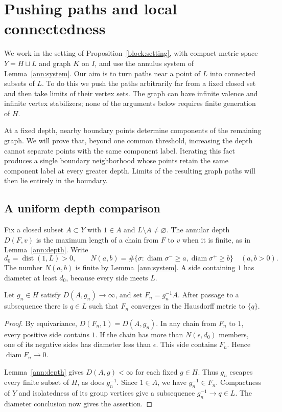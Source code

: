 \section{Pushing paths and local connectedness}\label{sec:path-pushing}

We work in the setting of Proposition~\ref{block:setting}, with compact
metric space $Y=H\sqcup L$ and graph $K$ on $I$, and use the annulus system
of Lemma~\ref{ann:system}.  Our aim is to turn paths near a point of $L$
into connected subsets of $L$.  To do this we push the paths arbitrarily
far from a fixed closed set and then take limits of their vertex sets.
The graph can have infinite valence and infinite vertex stabilizers;
none of the arguments below requires finite generation of $H$.

At a fixed depth, nearby boundary points determine components of the
remaining graph. We will prove that, beyond one common threshold,
increasing the depth cannot separate points with the same component
label. Iterating this fact produces a single boundary neighborhood whose
points retain the same component label at every greater depth. Limits
of the resulting graph paths will then lie entirely in the boundary.

\subsection{A uniform depth comparison}

Fix a closed subset $A\subset Y$ with $1\in A$ and $L\setminus A\ne\varnothing$.
The annular depth $D(F,v)$ is the maximum length of a chain from $F$ to $v$
when it is finite, as in Lemma~\ref{ann:depth}.  Write
\[
 d_0=\operatorname{dist}(1,L)>0,
 \qquad
 N(a,b)=\#\{\sigma:
       \operatorname{diam}\sigma^-\ge a,
       \operatorname{diam}\sigma^+\ge b\}\quad(a,b>0).
\]
The number $N(a,b)$ is finite by Lemma~\ref{ann:system}.  A side containing
$1$ has diameter at least $d_0$, because every side meets $L$.

\begin{lemma}\label{push:shrinking}
Let $g_n\in H$ satisfy $D(A,g_n)\to\infty$, and set $F_n=g_n^{-1}A$.
After passage to a subsequence there is $q\in L$ such that $F_n$ converges
in the Hausdorff metric to $\{q\}$.
\end{lemma}
\begin{proof}
By equivariance, $D(F_n,1)=D(A,g_n)$.  In any chain from $F_n$ to $1$,
every positive side contains $1$.  If the chain has more than
$N(\epsilon,d_0)$ members, one of its negative sides has diameter less
than $\epsilon$.  This side contains $F_n$.  Hence
$\operatorname{diam}F_n\to0$.

Lemma~\ref{ann:depth} gives $D(A,g)<\infty$ for each fixed $g\in H$.
Thus $g_n$ escapes every finite subset of $H$, as does $g_n^{-1}$.
Since $1\in A$, we have $g_n^{-1}\in F_n$.  Compactness of $Y$ and
isolatedness of its group vertices give a subsequence
$g_n^{-1}\to q\in L$.  The diameter conclusion now gives the assertion.
\end{proof}

